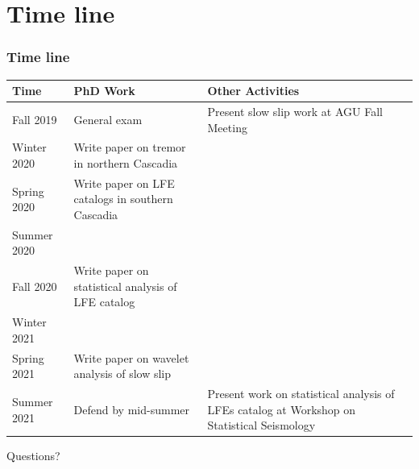 \documentclass{beamer}
\begin{document}

	\section*{Time line}

	\begin{frame}
		\frametitle{Time line}
		\begin{center}
		\tiny{
		\begin{tabular}{| p{1.5cm} p{5cm} p{3cm} |}
			\hline
			\textbf{Time} & \textbf{PhD Work} & \textbf{Other Activities} \\
			\hline
			Fall 2019 & General exam & Present slow slip work at AGU Fall Meeting \\
			\hline
			Winter 2020 & Write paper on tremor in northern Cascadia & \\
			\hline
			Spring 2020 & Write paper on LFE catalogs in southern Cascadia & \\
			\hline
			Summer 2020 & & \\
			\hline
			Fall 2020 & Write paper on statistical analysis of LFE catalog & \\
			\hline
			Winter 2021 & & \\
			\hline
			Spring 2021 & Write paper on wavelet analysis of slow slip & \\
			\hline
			Summer 2021 & Defend by mid-summer & Present work on statistical analysis of LFEs catalog at Workshop on Statistical Seismology \\
			\hline
		\end{tabular}
		}
		\end{center}
	\end{frame}

	\begin{frame}
		\begin{Huge}
			\begin{center}
				Questions?
			\end{center}
		\end{Huge}
	\end{frame}
			
\end{document}
